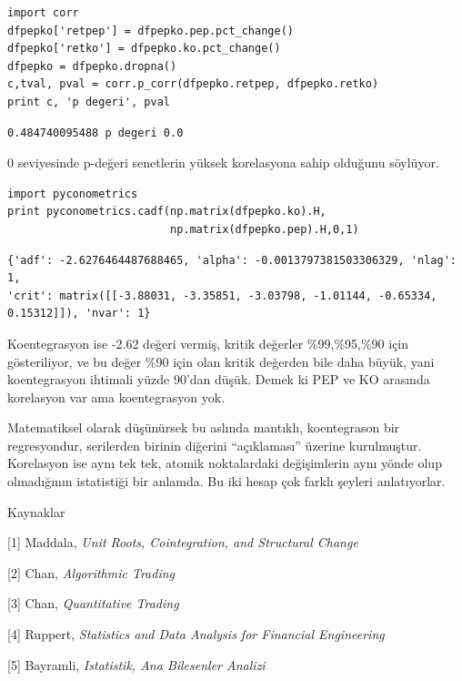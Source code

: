 \documentclass[12pt,fleqn]{article}\usepackage{../../common}
\begin{document}
\begin{verbatim}
import corr
dfpepko['retpep'] = dfpepko.pep.pct_change()
dfpepko['retko'] = dfpepko.ko.pct_change()
dfpepko = dfpepko.dropna()
c,tval, pval = corr.p_corr(dfpepko.retpep, dfpepko.retko)
print c, 'p degeri', pval
\end{verbatim}

\begin{verbatim}
0.484740095488 p degeri 0.0
\end{verbatim}

0 seviyesinde p-değeri senetlerin yüksek korelasyona sahip olduğunu
söylüyor. 

\begin{verbatim}
import pyconometrics
print pyconometrics.cadf(np.matrix(dfpepko.ko).H,
                         np.matrix(dfpepko.pep).H,0,1)
\end{verbatim}

\begin{verbatim}
{'adf': -2.6276464487688465, 'alpha': -0.0013797381503306329, 'nlag': 1,
'crit': matrix([[-3.88031, -3.35851, -3.03798, -1.01144, -0.65334,
0.15312]]), 'nvar': 1} 
\end{verbatim}

Koentegrasyon ise -2.62 değeri vermiş, kritik değerler \%99,\%95,\%90 için
gösteriliyor, ve bu değer \%90 için olan kritik değerden bile daha büyük,
yani koentegrasyon ihtimali yüzde 90'dan düşük. Demek ki PEP ve KO arasında
korelasyon var ama koentegrasyon yok.

Matematiksel olarak düşünürsek bu aslında mantıklı, koentegrason bir
regresyondur, serilerden birinin diğerini ``açıklaması'' üzerine
kurulmuştur. Korelasyon ise aynı tek tek, atomik noktalardaki değişimlerin
aynı yönde olup olmadığının istatistiği bir anlamda. Bu iki hesap çok
farklı şeyleri anlatıyorlar.

Kaynaklar 

[1] Maddala, {\em Unit Roots, Cointegration, and Structural Change}

[2] Chan, {\em Algorithmic Trading}

[3] Chan, {\em Quantitative Trading}

[4] Ruppert, {\em Statistics and Data Analysis for Financial Engineering}

[5] Bayramli, {\em Istatistik, Ana Bilesenler Analizi}
\end{document}
